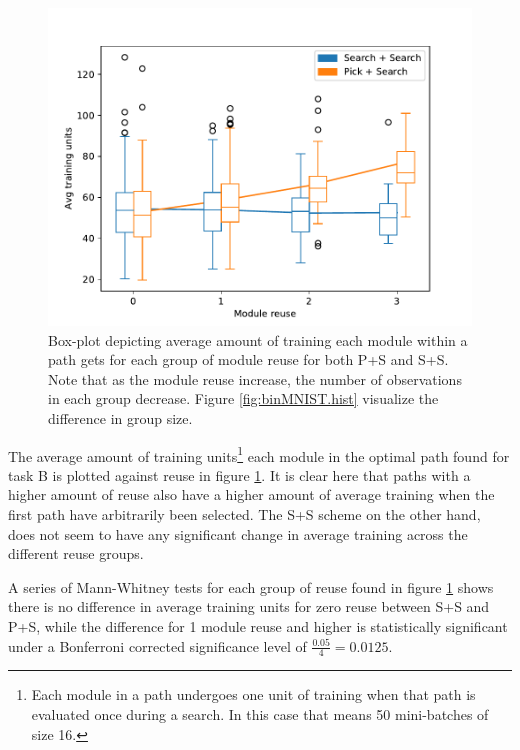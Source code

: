 \begin{figure}[t]
    \includegraphics[width=\textwidth]{Chapters/4.Experiments/exp1/figures/BIN_training_boxplot.pdf}
    \caption[Training boxplot for binary MNIST classification]{Box-plot depicting average amount of training each module within a path gets for each group of module reuse for both P+S and S+S. Note that as the module reuse increase, the number of observations in each group decrease. Figure \ref{fig:binMNIST.hist} visualize the difference in group size.}
    \label{fig:binMNIST.box}
\end{figure}

The average amount of training units\footnote{Each module in a path undergoes one unit of training when that path is evaluated once during a search. In this case that means 50 mini-batches of size 16.} each module in the optimal path found for task B is plotted against reuse in figure \ref{fig:binMNIST.box}. It is clear here that paths with a higher amount of reuse also have a higher amount of average training when the first path have arbitrarily been selected. The S+S scheme on the other hand, does not seem to have any significant change in average training across the different reuse groups. 

A series of Mann-Whitney tests for each group of reuse found in figure \ref{fig:binMNIST.box} shows there is no difference in average training units for zero reuse between S+S and P+S, while the difference for 1 module reuse and higher is statistically significant under a Bonferroni corrected significance level of \(\frac{0.05}{4}=0.0125\).

